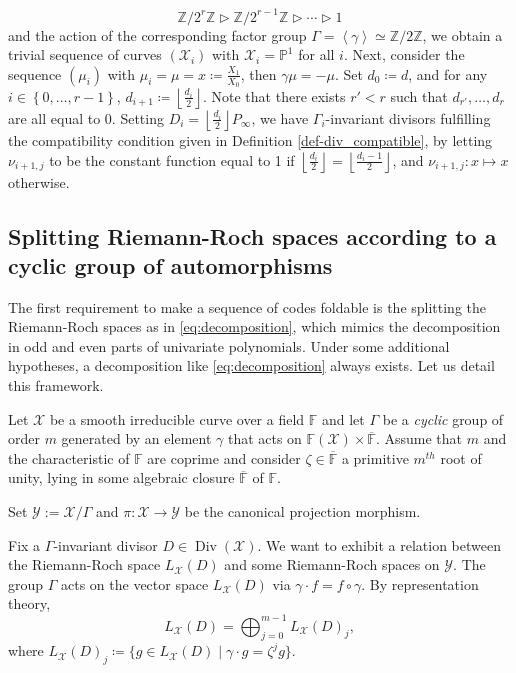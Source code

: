 \documentclass[a4paper,USenglish,autoref]{lipics-v2021}
\newcommand\F{\mathbb{F}}
\newcommand\PP{\mathbb{P}}
\newcommand\Z{\mathbb{Z}}
\newcommand\floor[1]{\left\lfloor #1 \right\rfloor}
\newcommand\gen[1]{\left\langle #1 \right\rangle}
\renewcommand{\bar}{\overline}
\DeclareMathOperator{\Div}{Div}
\newcommand{\set}[1]{\left\{#1\right\}}
\newcommand{\range}[1]{\set{0,\dots,#1-1}}
\newcommand\calY{\mathcal{Y}}
\newcommand\calX{\mathcal{X}}
\newcommand\mydef{\coloneqq}
\begin{document}
\begin{equation}
	\Z / 2^{r} \Z \vartriangleright \Z / 2^{r-1} \Z  \vartriangleright \cdots \vartriangleright 1
\end{equation}
and the action of the corresponding factor group $\Gamma = \gen{\gamma} \simeq \Z / 2 \Z$, we obtain a trivial sequence of curves $(\calX_i)$ with $\calX_i = \PP^1$ for all $i$. Next, consider the sequence $(\mu_i)$ with $\mu_i = \mu = x \mydef \frac{X_1}{X_0}$, then $\gamma \mu = - \mu$. Set $d_0 \mydef d$, and for any $i \in \range{r}$, $d_{i+1} \mydef \floor{\frac{d_i}{2}}$. Note that there exists $r' < r$ such that $d_{r'}, \dots, d_{r}$ are all equal to 0. 
Setting $D_i = \floor{\frac{d_i}{2}}P_\infty$, we have $\Gamma_i$-invariant divisors fulfilling the compatibility condition given in Definition \ref{def-div_compatible}, by letting $\nu_{i+1, j}$ to be the constant function equal to 1 if $\floor{\frac{d_i}{2}} = \floor{\frac{d_i-1}{2}}$, and $\nu_{i+1, j} : x \mapsto x$ otherwise.


\subsection{Splitting Riemann-Roch spaces according to a cyclic group of automorphisms}

The first requirement to make a sequence of codes foldable is the splitting the Riemann-Roch spaces as in \eqref{eq:decomposition}, which mimics the decomposition in odd and even parts of univariate polynomials.  Under some additional hypotheses, a decomposition like \eqref{eq:decomposition} always exists. Let us detail this framework.

\medskip

Let $\calX$ be a smooth irreducible curve over a field $\F$ and let $\Gamma$ be a \textit{cyclic} group of order $m$ generated by an element $\gamma$ that acts on $\F(\calX) \times \overline{\F}$. Assume that $m$ and the characteristic of $\F$ are coprime and consider $\zeta \in \bar{\F}$ a primitive $m^{th}$ root of unity, lying in some algebraic closure $\bar{\F}$ of $\F$. 

Set $\calY := \calX/\Gamma$ and $\pi : \calX \rightarrow \calY$ be the canonical projection morphism.

Fix a $\Gamma$-invariant divisor $D \in \Div(\calX)$. We want to exhibit a relation between the Riemann-Roch space $L_\calX(D)$ and some Riemann-Roch spaces on $\calY$. The group $\Gamma$ acts on the vector space $L_\calX(D)$ via $\gamma \cdot f = f \circ \gamma$. By representation theory,
\[L_\calX(D) = \bigoplus_{j=0}^{m-1} L_\calX(D)_j,\]
where $L_\calX(D)_j \mydef \{ g \in L_\calX(D) \mid \gamma \cdot g = \zeta^j g \}$.
\end{document}
